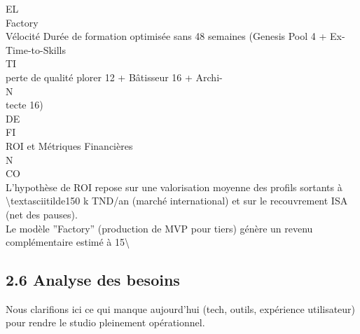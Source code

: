 \vspace{0.5em}
EL\\
Factory\\
Vélocité                                  Durée de formation optimisée sans         48 semaines (Genesis Pool 4 + Ex-        Time-to-Skills\\
\vspace{0.5em}
\vspace{0.5em}
\vspace{0.5em}
\vspace{0.5em}
TI\\
perte de qualité                          plorer 12 + Bâtisseur 16 + Archi-\\
\vspace{0.5em}
\vspace{0.5em}
\vspace{0.5em}
\vspace{0.5em}
N\\
tecte 16)\\
\vspace{0.5em}
\vspace{0.5em}
\vspace{0.5em}
\vspace{0.5em}
DE\\
FI\\
ROI et Métriques Financières\\
\vspace{0.5em}
\vspace{0.5em}
N\\
CO\\
L’hypothèse de ROI repose sur une valorisation moyenne des profils sortants à \textbackslash{}textasciitilde{}150 k TND/an (marché international) et sur le recouvrement ISA (net des pauses).\\
Le modèle ”Factory” (production de MVP pour tiers) génère un revenu complémentaire estimé à 15\textbackslash{}%
\vspace{0.5em}
\vspace{0.5em}
\vspace{0.5em}
\subsection{2.6 Analyse des besoins}
Nous clarifions ici ce qui manque aujourd’hui (tech, outils, expérience utilisateur) pour rendre le studio pleinement opérationnel.\\
\vspace{0.5em}
\vspace{0.5em}
